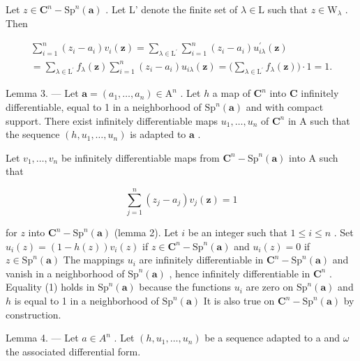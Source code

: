 Let \(z \in \mathbf{C}^n - \mathrm{Sp}^n(\boldsymbol{a})\) . Let L' denote the finite set of \(\lambda \in \mathrm{L}\) such that \(z \in \mathrm{W}_{\lambda}\) . Then

\[
\begin{array}{c} \sum_ {i = 1} ^ {n} (z _ {i} - a _ {i}) v _ {i} (\boldsymbol {z}) = \sum_ {\lambda \in \mathrm{L} ^ {\prime}} \sum_ {i = 1} ^ {n} (z _ {i} - a _ {i}) u _ {i \lambda} ^ {\prime} (\boldsymbol {z}) \\ = \sum_ {\lambda \in \mathrm{L} ^ {\prime}} f _ {\lambda} (\boldsymbol {z}) \sum_ {i = 1} ^ {n} (z _ {i} - a _ {i}) u _ {i \lambda} (\boldsymbol {z}) = \bigg (\sum_ {\lambda \in \mathrm{L} ^ {\prime}} f _ {\lambda} (\boldsymbol {z}) \bigg) \cdot 1 = 1. \end{array}
\]

Lemma 3. --- Let \(\boldsymbol{a} = (a_{1},\ldots ,a_{n})\in \mathrm{A}^{n}\) . Let \(h\) a map of \(\mathbf{C}^n\) into \(\mathbf{C}\) infinitely differentiable, equal to 1 in a neighborhood of \(\mathrm{Sp}^n (\boldsymbol {a})\) and with compact support. There exist infinitely differentiable maps \(u_{1},\ldots ,u_{n}\) of \(\mathbf{C}^n\) in A such that the sequence \((h,u_1,\dots,u_n)\) is adapted to \(\boldsymbol{a}\) .

Let \(v_{1},\ldots,v_{n}\) be infinitely differentiable maps from \(\mathbf{C}^{n}-\mathrm{Sp}^{n}(\boldsymbol{a})\) into A such that

\[
\sum_ {j = 1} ^ {n} (z _ {j} - a _ {j}) v _ {j} (\boldsymbol {z}) = 1
\]

for \(z\) into \(\mathbf{C}^n - \mathrm{Sp}^n(\boldsymbol{a})\) (lemma 2). Let \(i\) be an integer such that \(1 \leqslant i \leqslant n\) . Set \(u_i(z) = (1 - h(z))v_i(z)\) if \(z \in \mathbf{C}^n - \mathrm{Sp}^n(\boldsymbol{a})\) and \(u_i(z) = 0\) if \(z \in \mathrm{Sp}^n(\boldsymbol{a})\) The mappings \(u_i\) are infinitely differentiable in \(\mathbf{C}^n - \mathrm{Sp}^n(\boldsymbol{a})\) and vanish in a neighborhood of \(\mathrm{Sp}^n(\boldsymbol{a})\) , hence infinitely differentiable in \(\mathbf{C}^n\) . Equality (1) holds in \(\mathrm{Sp}^n(\boldsymbol{a})\) because the functions \(u_i\) are zero on \(\mathrm{Sp}^n(\boldsymbol{a})\) and \(h\) is equal to 1 in a neighborhood of \(\mathrm{Sp}^n(\boldsymbol{a})\) It is also true on \(\mathbf{C}^n - \mathrm{Sp}^n(\boldsymbol{a})\) by construction.

Lemma 4. — Let \(a \in A^{n}\) . Let \((h, u_{1}, \ldots, u_{n})\) be a sequence adapted to a and \(\omega\) the associated differential form.

